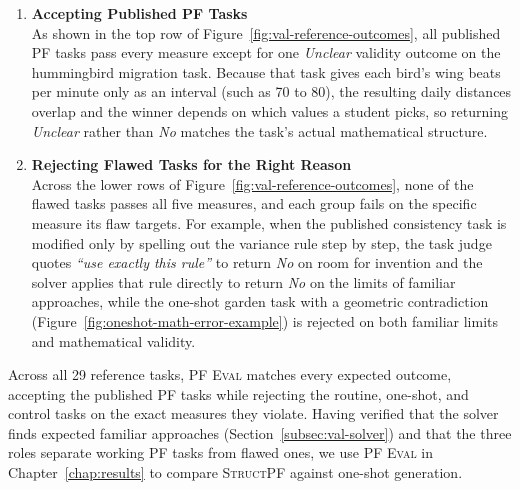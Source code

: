 \begin{enumerate}[leftmargin=0.6cm,label=\textbf{\arabic*.},itemsep=0.6em,topsep=0.4em]
    \item \textbf{Accepting Published PF Tasks}\\[0.2em]
    As shown in the top row of Figure~\ref{fig:val-reference-outcomes}, all published PF tasks pass every measure except for one \emph{Unclear} validity outcome on the hummingbird migration task. Because that task gives each bird's wing beats per minute only as an interval (such as 70 to 80), the resulting daily distances overlap and the winner depends on which values a student picks, so returning \emph{Unclear} rather than \emph{No} matches the task's actual mathematical structure.

    \item \textbf{Rejecting Flawed Tasks for the Right Reason}\\[0.2em]
    Across the lower rows of Figure~\ref{fig:val-reference-outcomes}, none of the flawed tasks passes all five measures, and each group fails on the specific measure its flaw targets. For example, when the published consistency task is modified only by spelling out the variance rule step by step, the task judge quotes \emph{``use exactly this rule''} to return \emph{No} on room for invention and the solver applies that rule directly to return \emph{No} on the limits of familiar approaches, while the one-shot garden task with a geometric contradiction (Figure~\ref{fig:oneshot-math-error-example}) is rejected on both familiar limits and mathematical validity.
\end{enumerate}

Across all 29 reference tasks, \textsc{PF Eval} matches every expected outcome, accepting the published PF tasks while rejecting the routine, one-shot, and control tasks on the exact measures they violate. Having verified that the solver finds expected familiar approaches (Section~\ref{subsec:val-solver}) and that the three roles separate working PF tasks from flawed ones, we use \textsc{PF Eval} in Chapter~\ref{chap:results} to compare \textsc{StructPF} against one-shot generation.
